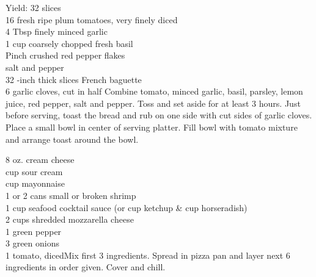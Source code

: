 \begin{minipage}{\linewidth}
\end{minipage}\par\begin{minipage}{\linewidth} 
Yield: 32 slices \\
	\step
	{16 fresh ripe plum tomatoes, very finely diced \\
	 4 Tbsp finely minced garlic	\\
	 1 cup coarsely chopped fresh basil\\
	 Pinch crushed red pepper flakes	\\
	 salt and pepper\\
	 32 -inch thick slices French baguette	\\
	 6 garlic cloves, cut in half
		}{
Combine tomato, minced garlic, basil, parsley, lemon juice, red pepper, salt and pepper. Toss and set aside for at least 3 hours. Just before serving, toast the bread and rub on one side with cut sides of garlic cloves. Place a small bowl in center of serving platter. Fill bowl with tomato mixture and arrange toast around the bowl. }

\end{minipage}\par\begin{minipage}{\linewidth}   
	\step
	{8 oz. cream cheese	\\
	  cup sour cream\\
	  cup mayonnaise	\\
	 1 or 2 cans small or broken shrimp\\
	 1 cup seafood cocktail sauce (or  cup ketchup \&  cup horseradish) \\
	 2 cups shredded mozzarella cheese	\\
	 1 green pepper\\
	 3 green onions	\\
	 1 tomato, diced}{Mix first 3 ingredients. Spread in pizza pan and layer next 6 ingredients in order given. Cover and chill.}


\end{minipage}
